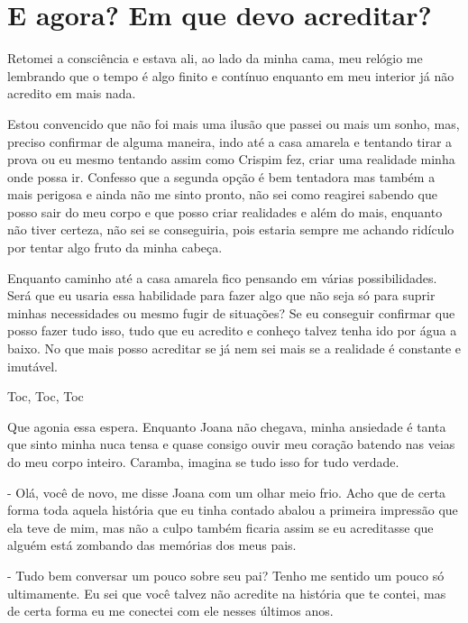 
\chapter{E agora? Em que devo acreditar?}


Retomei a consciência e estava ali, ao lado da minha cama, meu relógio me lembrando que o tempo é algo finito e contínuo enquanto em meu interior já não acredito em mais nada.

Estou convencido que não foi mais uma ilusão que passei ou mais um sonho, mas, preciso confirmar de alguma maneira, indo até a casa amarela e tentando tirar a prova ou eu mesmo tentando assim como Crispim fez, criar uma realidade minha onde possa ir. Confesso que a segunda opção é bem tentadora mas também a mais perigosa e ainda não me sinto pronto, não sei como reagirei sabendo que posso sair do meu corpo e que posso criar realidades e além do mais, enquanto não tiver certeza, não sei se conseguiria, pois estaria sempre me achando ridículo por tentar algo fruto da minha cabeça.

Enquanto caminho até a casa amarela fico pensando em várias possibilidades. Será que eu usaria essa habilidade para fazer algo que não seja só para suprir minhas necessidades ou mesmo fugir de situações? Se eu conseguir confirmar que posso fazer tudo isso, tudo que eu acredito e conheço talvez tenha ido por água a baixo. No que mais posso acreditar se já nem sei mais se a realidade é constante e imutável.

Toc, Toc, Toc

Que agonia essa espera. Enquanto Joana não chegava, minha ansiedade é tanta que sinto minha nuca tensa e quase consigo ouvir meu coração batendo nas veias do meu corpo inteiro. Caramba, imagina se tudo isso for tudo verdade.

- Olá, você de novo, me disse Joana com um olhar meio frio. Acho que de certa forma toda aquela história que eu tinha contado abalou a primeira impressão que ela teve de mim, mas não a culpo também ficaria assim se eu acreditasse que alguém está zombando das memórias dos meus pais.

- Tudo bem conversar um pouco sobre seu pai? Tenho me sentido um pouco só ultimamente. Eu sei que você talvez não acredite na história que te contei, mas de certa forma eu me conectei com ele nesses últimos anos.

